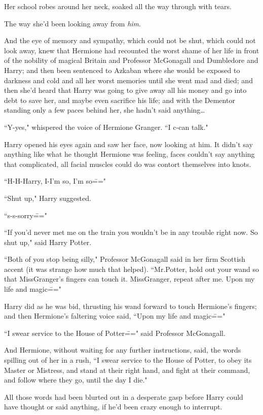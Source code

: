 Her school robes around her neck, soaked all the way through with tears.

The way she'd been looking away from \emph{him}.

And the eye of memory and sympathy, which could not be shut, which could not look away, knew that Hermione had recounted the worst shame of her life in front of the nobility of magical Britain and Professor McGonagall and Dumbledore and Harry; and then been sentenced to Azkaban where she would be exposed to darkness and cold and all her worst memories until she went mad and died; and then she'd heard that Harry was going to give away all his money and go into debt to save her, and maybe even sacrifice his life; and with the Dementor standing only a few paces behind her, she hadn't said anything{\ldots}

``Y-yes," whispered the voice of Hermione Granger. ``I c-can talk."

Harry opened his eyes again and saw her face, now looking at him. It didn't say anything like what he thought Hermione was feeling, faces couldn't say anything that complicated, all facial muscles could do was contort themselves into knots.

``H-H-Harry, I-I'm so, I'm so\==="

``Shut up," Harry suggested.

``s-s-sorry\==="

``If you'd never met me on the train you wouldn't be in any trouble right now. So shut up," said Harry Potter.

``Both of you stop being silly," Professor McGonagall said in her firm Scottish accent (it was strange how much that helped). ``Mr.\?Potter, hold out your wand so that Miss\?Granger's fingers can touch it. Miss\?Granger, repeat after me. Upon my life and magic\==="

Harry did as he was bid, thrusting his wand forward to touch Hermione's fingers; and then Hermione's faltering voice said, ``Upon my life and magic\==="

``I swear service to the House of Potter\===" said Professor McGonagall.

And Hermione, without waiting for any further instructions, said, the words spilling out of her in a rush, ``I swear service to the House of Potter, to obey its Master or Mistress, and stand at their right hand, and fight at their command, and follow where they go, until the day I die."

All those words had been blurted out in a desperate gasp before Harry could have thought or said anything, if he'd been crazy enough to interrupt.

